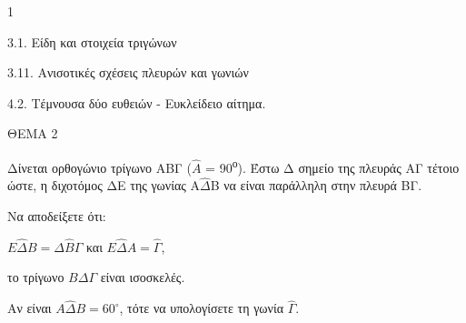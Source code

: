 \begin{ylh}{1}
    \item 3.1. Είδη και στοιχεία τριγώνων
    \item 3.11. Ανισοτικές σχέσεις πλευρών και γωνιών
    \item 4.2. Τέμνουσα δύο ευθειών - Ευκλείδειο αίτημα.
\end{ylh}

ΘΕΜΑ 2

Δίνεται ορθογώνιο τρίγωνο ΑΒΓ ($\widehat{Α}$ = 90\textsuperscript{ο}). Έστω Δ σημείο της πλευράς ΑΓ τέτοιο ώστε, η διχοτόμος ΔΕ της γωνίας Α$\widehat{\Delta}$Β να είναι παράλληλη στην πλευρά ΒΓ.

\begin{alist}
\item Να αποδείξετε ότι:
\begin{rlist}
\item $E\widehat{\Delta}B = \Delta\widehat{B}\Gamma$ και $E\widehat{\Delta}A = \widehat{\Gamma}$, 
\item το τρίγωνο $B\Delta\Gamma$ είναι ισοσκελές. 
\end{rlist}

\item Αν είναι $A\widehat{\Delta}B = 60^{\circ}$, τότε να υπολογίσετε τη γωνία $\widehat{\Gamma}$. 

\begin{center}
\end{center}
\end{alist}

